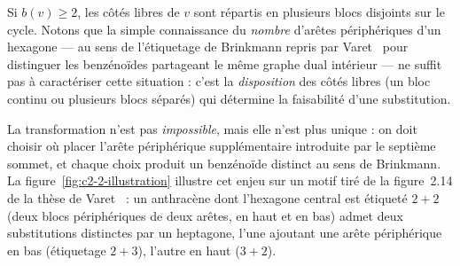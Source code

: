 \documentclass[11pt,a4paper]{article}
\begin{document}
Si $b(v) \ge 2$, les côtés libres de $v$ sont répartis en plusieurs blocs disjoints sur le cycle.
Notons que la simple connaissance du \emph{nombre} d'arêtes périphériques
d'un hexagone --- au sens de l'étiquetage de Brinkmann repris par
Varet~\cite{varet2022} pour distinguer les benzénoïdes partageant le
même graphe dual intérieur --- ne suffit pas à caractériser cette
situation : c'est la \emph{disposition} des côtés libres (un bloc
continu ou plusieurs blocs séparés) qui détermine la faisabilité d'une
substitution.

La transformation n'est pas \emph{impossible}, mais elle n'est plus
unique : on doit choisir où placer l'arête périphérique supplémentaire
introduite par le septième sommet, et chaque choix produit un benzénoïde
distinct au sens de Brinkmann. La figure~\ref{fig:c2-2-illustration}
illustre cet enjeu sur un motif tiré de la figure~2.14 de la
thèse de Varet~\cite{varet2022} : un anthracène dont l'hexagone central
est étiqueté $2{+}2$ (deux blocs périphériques de deux arêtes, en haut
et en bas) admet deux substitutions distinctes par un heptagone, l'une
ajoutant une arête périphérique en bas (étiquetage $2{+}3$), l'autre en
haut ($3{+}2$).
\end{document}
